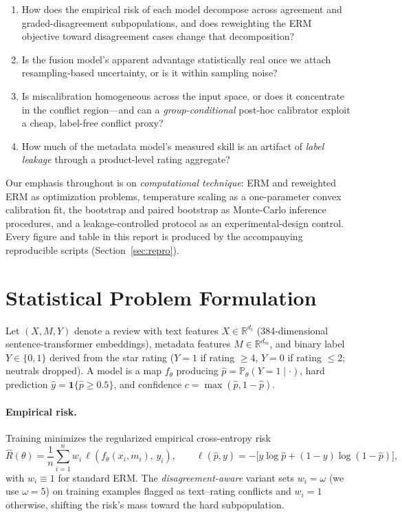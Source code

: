 \documentclass[11pt,a4paper]{article}
\begin{document}
\begin{enumerate}[leftmargin=*,nosep]
  \item How does the empirical risk of each model decompose across agreement and
        graded-disagreement subpopulations, and does reweighting the ERM
        objective toward disagreement cases change that decomposition?
  \item Is the fusion model's apparent advantage statistically real once we
        attach resampling-based uncertainty, or is it within sampling noise?
  \item Is miscalibration homogeneous across the input space, or does it
        concentrate in the conflict region---and can a \emph{group-conditional}
        post-hoc calibrator exploit a cheap, label-free conflict proxy?
  \item How much of the metadata model's measured skill is an artifact of
        \emph{label leakage} through a product-level rating aggregate?
\end{enumerate}

Our emphasis throughout is on \emph{computational technique}: ERM and reweighted
ERM as optimization problems, temperature scaling as a one-parameter convex
calibration fit, the bootstrap and paired bootstrap as Monte-Carlo inference
procedures, and a leakage-controlled protocol as an experimental-design control.
Every figure and table in this report is produced by the accompanying
reproducible scripts (Section~\ref{sec:repro}).

\section{Statistical Problem Formulation}
\label{sec:formulation}

Let $(X, M, Y)$ denote a review with text features $X \in \mathbb{R}^{d_t}$
(384-dimensional sentence-transformer embeddings), metadata features
$M \in \mathbb{R}^{d_m}$, and binary label $Y \in \{0,1\}$ derived from the star
rating ($Y=1$ if rating $\geq 4$, $Y=0$ if rating $\leq 2$; neutrals dropped).
A model is a map $f_\theta$ producing $\hat p = \mathbb{P}_\theta(Y=1\mid \cdot)$,
hard prediction $\hat y = \mathbf{1}\{\hat p \geq 0.5\}$, and confidence
$c = \max(\hat p, 1-\hat p)$.

\paragraph{Empirical risk.}
Training minimizes the regularized empirical cross-entropy risk
\[
\hat R(\theta) = \frac{1}{n}\sum_{i=1}^{n} w_i\,
\ell\!\left(f_\theta(x_i,m_i),\, y_i\right),
\qquad
\ell(\hat p, y) = -\big[y\log \hat p + (1-y)\log(1-\hat p)\big],
\]
with $w_i \equiv 1$ for standard ERM. The \emph{disagreement-aware} variant sets
$w_i = \omega$ (we use $\omega=5$) on training examples flagged as
text--rating conflicts and $w_i=1$ otherwise, shifting the risk's mass toward the
hard subpopulation.
\end{document}
